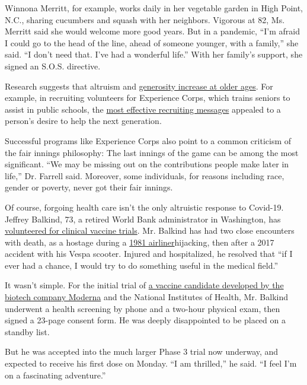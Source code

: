 Winnona Merritt, for example, works daily in her vegetable garden in
High Point, N.C., sharing cucumbers and squash with her neighbors.
Vigorous at 82, Ms. Merritt said she would welcome more good years. But
in a pandemic, ``I'm afraid I could go to the head of the line, ahead of
someone younger, with a family,'' she said. ``I don't need that. I've
had a wonderful life.'' With her family's support, she signed an S.O.S.
directive.

Research suggests that altruism and
\href{https://academic.oup.com/psychsocgerontology/article/74/1/52/3105859}{generosity
increase at older ages}. For example, in recruiting volunteers for
Experience Corps, which trains seniors to assist in public schools, the
\href{https://ajph.aphapublications.org/doi/full/10.2105/AJPH.2009.169151}{most
effective recruiting messages} appealed to a person's desire to help the
next generation.

Successful programs like Experience Corps also point to a common
criticism of the fair innings philosophy: The last innings of the game
can be among the most significant. ``We may be missing out on the
contributions people make later in life,'' Dr. Farrell said. Moreover,
some individuals, for reasons including race, gender or poverty, never
got their fair innings.

Of course, forgoing health care isn't the only altruistic response to
Covid-19. Jeffrey Balkind, 73, a retired World Bank administrator in
Washington, has
\href{https://www.coronaviruspreventionnetwork.org/}{volunteered for
clinical vaccine trials}. Mr. Balkind has had two close encounters with
death, as a hostage during a
\href{https://www.washingtonpost.com/archive/lifestyle/1994/09/23/amateur-chronicles-crisis/0a961fb6-af41-4857-8884-5bfc0a3511fd/}{1981
airliner}hijacking, then after a 2017 accident with his Vespa scooter.
Injured and hospitalized, he resolved that ``if I ever had a chance, I
would try to do something useful in the medical field.''

It wasn't simple. For the initial trial of
\href{https://www.nytimes.com/2020/07/27/health/moderna-vaccine-covid.html}{a
vaccine candidate developed by the biotech company Moderna} and the
National Institutes of Health, Mr. Balkind underwent a health screening
by phone and a two-hour physical exam, then signed a 23-page consent
form. He was deeply disappointed to be placed on a standby list.

But he was accepted into the much larger Phase 3 trial now underway, and
expected to receive his first dose on Monday. ``I am thrilled,'' he
said. ``I feel I'm on a fascinating adventure.''

